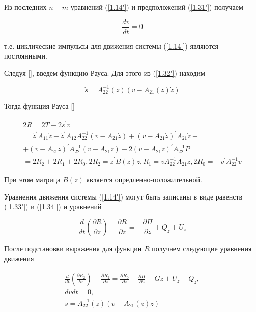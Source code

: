 Из последних $n - m$ уравнений (\ref{1.14'}) и предположений (\ref{1.31'}) получаем 

\begin{equation} \label{1.33'}
\frac{d v}{d t} = 0
\end{equation}

т.е. циклические импульсы для движения системы (\ref{1.14'}) являются постоянными.

Следуя [], введем функцию Рауса. Для этого из (\ref{1.32'}) находим

\begin{equation} \label{1.34'}
\dot s = A_{22}^{-1} (z) (v - A_{21} (z) \dot z)
\end{equation}

Тогда функция Рауса [] 

\begin{equation} \label{1.35'}
\begin{array}{c}
	2R = 2T - 2 \dot s^{'} v =\\
	= \dot z^{'} A_{11} \dot z + \dot z^{'} A_{12} A_{22}^{-1} (v - A_{21} \dot z) + (v - A_{21} \dot z)^{'} A_{21} \dot z +\\
	+ (v - A_21 \dot z)^{'} A_{22}^{-1} (v - A_{21} \dot z) - 2 (v - A_{21} \dot z)^{'} A_{22}^{-1} P =\\
	= 2 R_2 + 2 R_1 + 2 R_0, 2 R_2 = \dot z^{'} B (z) \dot z, R_1 = v A_{22}^{-1} A_{21} \dot z, 2 R_0 = - v^{'} A_{22}^{-1} v
\end{array}
\end{equation}

При этом матрица $B(z)$ является опредленно-положительной.

Уравнения движения системы (\ref{1.14'}) могут быть записаны в виде равенств (\ref{1.33'}) и (\ref{1.34'}) и уравнений

\begin{equation} \label{1.36'}
\frac{d}{dt} \left( \frac{\partial R}{\partial \dot z} \right) - \frac{\partial R}{\partial z} = - \frac{\partial \Pi}{\partial z} + Q_z + U_z
\end{equation}

После подстановки выражения для функции $R$ получаем следующие уравнения движения 

\begin{equation} \label{1.37'}
\begin{array}{c}
\displaystyle \frac{d}{dt} \left( \frac{\partial R_2}{\partial \dot z} \right) - \frac{\partial R_2}{\partial z} = \frac{\partial R_0}{\partial z} - \frac{\partial \Pi}{\partial z} - G \dot z + U_z + Q_z,\\
{d v}{d t} = 0,\\
\displaystyle \dot s = A_{22}^{-1} (z) (v - A_{21} (z) \dot z)
\end{array}
\end{equation}

